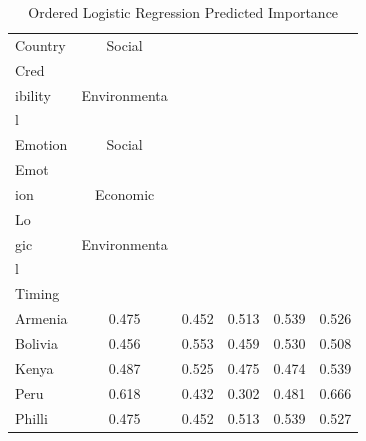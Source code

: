 \begin{table}[htbp]
\centering
\small
\caption{Ordered Logistic Regression Predicted Importance}
\label{tab:olr_importance}
\begin{tabular}{lccccc}
\toprule
Country & Social\\Cred \\[-0.5ex] ibility & Environmenta \\[-0.5ex] l\\Emotion & Social\\Emot \\[-0.5ex] ion & Economic\\Lo \\[-0.5ex] gic & Environmenta \\[-0.5ex] l\\Timing \\
\midrule
 Armenia & 0.475 & 0.452 & 0.513 & 0.539 & 0.526 \\
 Bolivia & 0.456 & 0.553 & 0.459 & 0.530 & 0.508 \\
 Kenya & 0.487 & 0.525 & 0.475 & 0.474 & 0.539 \\
 Peru & 0.618 & 0.432 & 0.302 & 0.481 & 0.666 \\
 Philli & 0.475 & 0.452 & 0.513 & 0.539 & 0.527 \\
\bottomrule
\end{tabular}
\end{table}
